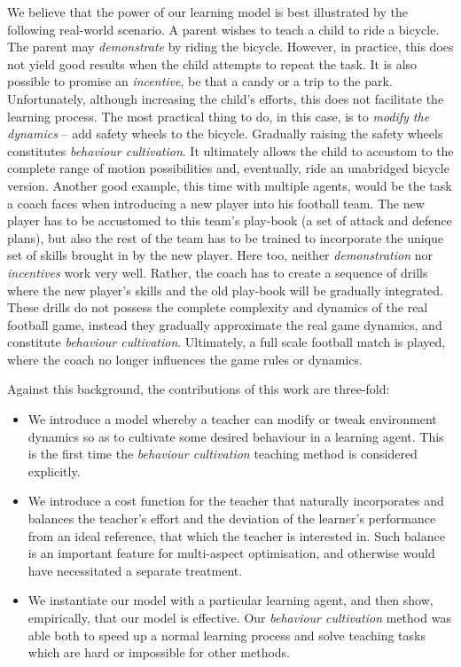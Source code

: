 We believe that the power of our learning model is best illustrated by
the following real-world scenario. A parent wishes to teach a child to
ride a bicycle. The parent may {\em demonstrate} by riding the
bicycle. However, in practice, this does not yield good results when
the child attempts to repeat the task. It is also possible to promise
an {\em incentive}, be that a candy or a trip to the
park. Unfortunately, although increasing the child's efforts, this
does not facilitate the learning process. The most practical thing to
do, in this case, is to {\em modify the dynamics} -- add safety wheels
to the bicycle. Gradually raising the safety wheels constitutes {\em
  behaviour cultivation}. It ultimately allows the child to accustom
to the complete range of motion possibilities and, eventually, ride an
unabridged bicycle version. Another good example, this time with
multiple agents, would be the task a coach faces when introducing a
new player into his football team. The new player has to be accustomed
to this team's play-book (a set of attack and defence plans), but also
the rest of the  team has to be trained to incorporate the unique set of
skills brought in by the new player. Here too, neither {\em
  demonstration} nor {\em incentives} work very well. Rather, the
coach has to create a sequence of drills where the new player's skills
and the old play-book will be gradually integrated. These drills do
not possess the complete complexity and dynamics of the real football
game, instead they gradually approximate the real game dynamics, and
constitute {\em behaviour cultivation}. Ultimately, a full scale
football match is played, where the coach no longer influences the
game rules or dynamics.

Against this background, the contributions of this work are three-fold:
\begin{itemize}
\item We introduce a model whereby a teacher can modify or tweak
  environment dynamics so as to cultivate some desired behaviour in a
  learning agent. This is the first time the {\em behaviour
    cultivation} teaching method is considered explicitly.
\item We introduce a cost function for the teacher that naturally
  incorporates and balances the teacher's effort and the deviation of
  the learner's performance from an ideal reference, that which the
  teacher is interested in. Such balance is an important feature for
  multi-aspect optimisation, and otherwise would have necessitated a
  separate treatment.
\item We instantiate our model with a particular learning agent, and
  then show, empirically, that our model is effective. Our {\em
    behaviour cultivation} method was able both to speed up a normal
  learning process and solve teaching tasks which are hard or
  impossible for other methods.
\end{itemize}

